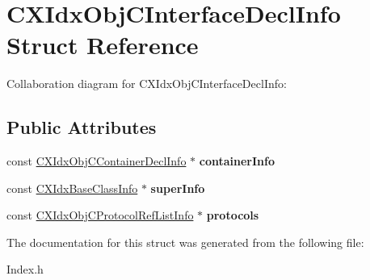 \hypertarget{structCXIdxObjCInterfaceDeclInfo}{}\section{C\+X\+Idx\+Obj\+C\+Interface\+Decl\+Info Struct Reference}
\label{structCXIdxObjCInterfaceDeclInfo}


Collaboration diagram for C\+X\+Idx\+Obj\+C\+Interface\+Decl\+Info\+:
\subsection*{Public Attributes}
\begin{DoxyCompactItemize}
\item 
\mbox{\label{structCXIdxObjCInterfaceDeclInfo_a78f2d414d9b454cf8e8c4c98465a3b60}} 
const \hyperlink{structCXIdxObjCContainerDeclInfo}{C\+X\+Idx\+Obj\+C\+Container\+Decl\+Info} $\ast$ {\bfseries container\+Info}
\item 
\mbox{\label{structCXIdxObjCInterfaceDeclInfo_a4e3694b3b541e1439b3943b9018fef2b}} 
const \hyperlink{structCXIdxBaseClassInfo}{C\+X\+Idx\+Base\+Class\+Info} $\ast$ {\bfseries super\+Info}
\item 
\mbox{\label{structCXIdxObjCInterfaceDeclInfo_ae80ff98875781dfda5b52f76f3629fe6}} 
const \hyperlink{structCXIdxObjCProtocolRefListInfo}{C\+X\+Idx\+Obj\+C\+Protocol\+Ref\+List\+Info} $\ast$ {\bfseries protocols}
\end{DoxyCompactItemize}


The documentation for this struct was generated from the following file\+:\begin{DoxyCompactItemize}
\item 
Index.\+h\end{DoxyCompactItemize}
